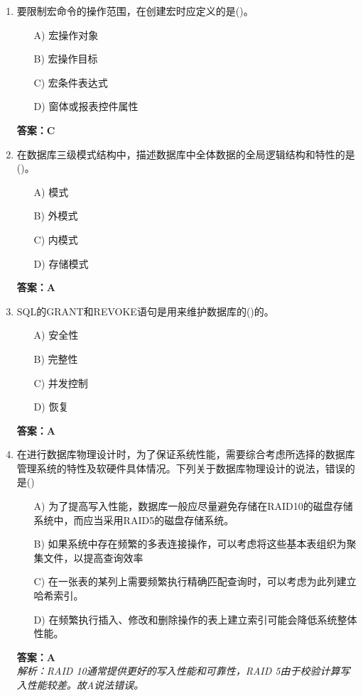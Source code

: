 \documentclass[a4paper,12pt]{article}
\begin{document}
\begin{enumerate}[label=\arabic*.]
\item 要限制宏命令的操作范围，在创建宏时应定义的是()。
\begin{itemize}
    \item[A)] 宏操作对象
    \item[B)] 宏操作目标
    \item[C)] 宏条件表达式
    \item[D)] 窗体或报表控件属性
\end{itemize}
\textbf{答案：C}

\item 在数据库三级模式结构中，描述数据库中全体数据的全局逻辑结构和特性的是()。
\begin{itemize}
    \item[A)] 模式
    \item[B)] 外模式
    \item[C)] 内模式
    \item[D)] 存储模式
\end{itemize}
\textbf{答案：A}

\item SQL的GRANT和REVOKE语句是用来维护数据库的()的。
\begin{itemize}
    \item[A)] 安全性
    \item[B)] 完整性
    \item[C)] 并发控制
    \item[D)] 恢复
\end{itemize}
\textbf{答案：A}

\item 在进行数据库物理设计时，为了保证系统性能，需要综合考虑所选择的数据库管理系统的特性及软硬件具体情况。下列关于数据库物理设计的说法，错误的是()
\begin{itemize}
    \item[A)] 为了提高写入性能，数据库一般应尽量避免存储在RAID10的磁盘存储系统中，而应当采用RAID5的磁盘存储系统。
    \item[B)] 如果系统中存在频繁的多表连接操作，可以考虑将这些基本表组织为聚集文件，以提高查询效率
    \item[C)] 在一张表的某列上需要频繁执行精确匹配查询时，可以考虑为此列建立哈希索引。
    \item[D)] 在频繁执行插入、修改和删除操作的表上建立索引可能会降低系统整体性能。
\end{itemize}
\textbf{答案：A} \\
\textit{解析：RAID 10通常提供更好的写入性能和可靠性，RAID 5由于校验计算写入性能较差。故A说法错误。}


\end{enumerate}
\end{document}
